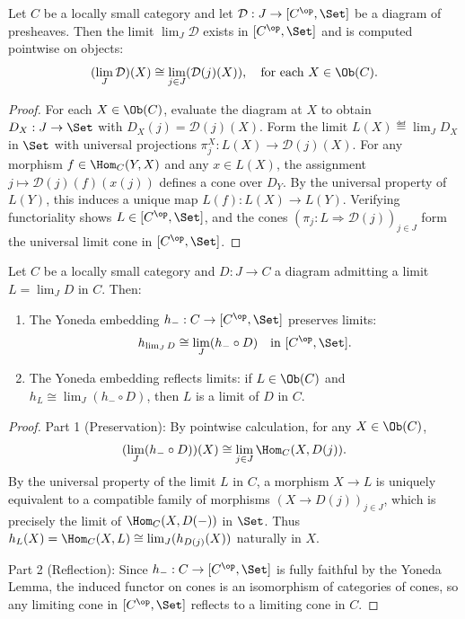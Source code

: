 \begin{theorem}
Let $C$ be a locally small category and let $\mathcal{D} : J \to [C^\op, \Set]$ be a diagram of presheaves. Then the limit $\lim_J \mathcal{D}$ exists in $[C^\op, \Set]$ and is computed pointwise on objects:
\[
(\lim_J \mathcal{D})(X) \cong \lim_{j \in J} (\mathcal{D}(j)(X)), \quad \text{for each } X \in \Ob(C).
\]
\end{theorem}
\begin{proof}
For each $X \in \Ob(C)$, evaluate the diagram at $X$ to obtain $D_X : J \to \Set$ with $D_X(j) = \mathcal{D}(j)(X)$. Form the limit $L(X) \eqdef \lim_J D_X$ in $\Set$ with universal projections $\pi_j^X : L(X) \to \mathcal{D}(j)(X)$. For any morphism $f \in \Hom_C(Y, X)$ and any $x \in L(X)$, the assignment $j \mapsto \mathcal{D}(j)(f)(x(j))$ defines a cone over $D_Y$. By the universal property of $L(Y)$, this induces a unique map $L(f) : L(X) \to L(Y)$. Verifying functoriality shows $L \in [C^\op, \Set]$, and the cones $(\pi_j : L \Rightarrow \mathcal{D}(j))_{j \in J}$ form the universal limit cone in $[C^\op, \Set]$.
\end{proof}

\begin{theorem}
Let $C$ be a locally small category and $D : J \to C$ a diagram admitting a limit $L = \lim_J D$ in $C$. Then:
\begin{enumerate}
    \item The Yoneda embedding $h_- : C \to [C^\op, \Set]$ preserves limits:
    \[
    h_{\lim_J D} \cong \lim_J (h_- \circ D) \quad \text{in } [C^\op, \Set].
    \]
    \item The Yoneda embedding reflects limits: if $L \in \Ob(C)$ and $h_L \cong \lim_J (h_- \circ D)$, then $L$ is a limit of $D$ in $C$.
\end{enumerate}
\end{theorem}
\begin{proof}
Part 1 (Preservation): By pointwise calculation, for any $X \in \Ob(C)$,
\[
(\lim_J (h_- \circ D))(X) \cong \lim_{j \in J} \Hom_C(X, D(j)).
\]
By the universal property of the limit $L$ in $C$, a morphism $X \to L$ is uniquely equivalent to a compatible family of morphisms $(X \to D(j))_{j \in J}$, which is precisely the limit of $\Hom_C(X, D(-))$ in $\Set$. Thus $h_L(X) = \Hom_C(X, L) \cong \lim_J (h_{D(j)}(X))$ naturally in $X$.

Part 2 (Reflection): Since $h_- : C \to [C^\op, \Set]$ is fully faithful by the Yoneda Lemma, the induced functor on cones is an isomorphism of categories of cones, so any limiting cone in $[C^\op, \Set]$ reflects to a limiting cone in $C$.
\end{proof}
